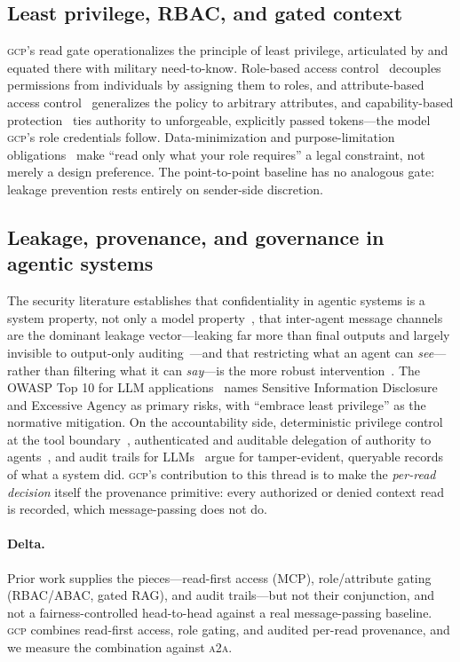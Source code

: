 \documentclass[10pt,twocolumn,letterpaper]{article}
\newcommand{\gcp}{\textsc{gcp}}
\newcommand{\ata}{\textsc{a2a}}
\begin{document}
\subsection{Least privilege, RBAC, and gated context}
\gcp{}'s read gate operationalizes the principle of least privilege, articulated by
\citet{saltzer1975} and equated there with military need-to-know. Role-based access
control~\citep{sandhu1996} decouples permissions from individuals by assigning them to roles, and
attribute-based access control~\citep{nist800162} generalizes the policy to arbitrary attributes,
and capability-based protection~\citep{dennis1966} ties authority to unforgeable, explicitly passed
tokens---the model \gcp{}'s role credentials follow. Data-minimization and purpose-limitation
obligations~\citep{gdpr2016} make ``read only what your role requires'' a legal constraint, not
merely a design preference. The point-to-point baseline has
no analogous gate: leakage prevention rests entirely on sender-side discretion.

\subsection{Leakage, provenance, and governance in agentic systems}
The security literature establishes that confidentiality in agentic systems is a system property,
not only a model property~\citep{evertz2024whispers}, that inter-agent message channels are the
dominant leakage vector---leaking far more than final outputs and largely invisible to output-only
auditing~\citep{elyagoubi2026agentleak}---and that restricting what an agent can
\emph{see}---rather than filtering what it can \emph{say}---is the more robust
intervention~\citep{bagdasarian2024airgap}. The OWASP Top 10 for LLM
applications~\citep{owasp2025} names Sensitive Information Disclosure and Excessive Agency as
primary risks, with ``embrace least privilege'' as the normative mitigation. On the accountability
side, deterministic privilege control at the tool boundary~\citep{shi2025progent}, authenticated and
auditable delegation of authority to agents~\citep{south2025delegation}, and audit trails
for LLMs~\citep{ojewale2025audit} argue for tamper-evident, queryable records of what a system did.
\gcp{}'s contribution to this thread is to make the \emph{per-read decision} itself the provenance
primitive: every authorized or denied context read is recorded, which message-passing does not do.

\paragraph{Delta.} Prior work supplies the pieces---read-first access (MCP), role/attribute gating
(RBAC/ABAC, gated RAG), and audit trails---but not their conjunction, and not a fairness-controlled
head-to-head against a real message-passing baseline. \gcp{} combines read-first access, role
gating, and audited per-read provenance, and we measure the combination against \ata{}.
\end{document}
